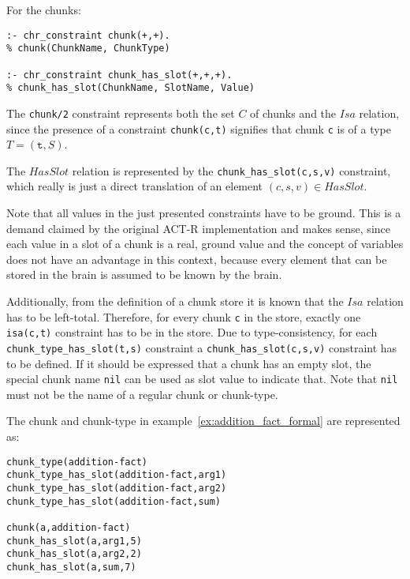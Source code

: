For the chunks:

\begin{lstlisting}
:- chr_constraint chunk(+,+).
% chunk(ChunkName, ChunkType)

:- chr_constraint chunk_has_slot(+,+,+).
% chunk_has_slot(ChunkName, SlotName, Value)
\end{lstlisting}

The \lstinline|chunk/2| constraint represents both the set $C$ of chunks and the $Isa$ relation, since the presence of a constraint \lstinline|chunk(c,t)| signifies that chunk \lstinline|c| is of a type $T = (\mathtt{t},S)$.

The $HasSlot$ relation is represented by the \lstinline|chunk_has_slot(c,s,v)| constraint, which really is just a direct translation of an element $(c,s,v) \in HasSlot$.

Note that all values in the just presented constraints have to be ground. This is a demand claimed by the original ACT-R implementation and makes sense, since each value in a slot of a chunk is a real, ground value and the concept of variables does not have an advantage in this context, because every element that can be stored in the brain is assumed to be known by the brain.

Additionally, from the definition of a chunk store it is known that the $Isa$ relation has to be left-total. Therefore, for every chunk \lstinline|c| in the store, exactly one \lstinline|isa(c,t)| constraint has to be in the store. Due to type-consistency, for each \lstinline|chunk_type_has_slot(t,s)| constraint a \lstinline|chunk_has_slot(c,s,v)| constraint has to be defined. If it should be expressed that a chunk has an empty slot, the special chunk name \lstinline|nil| can be used as slot value to indicate that. Note that \lstinline|nil| must not be the name of a regular chunk or chunk-type.

\begin{example}
\label{ex:addition_fact_chr}
The chunk and chunk-type in example~\ref{ex:addition_fact_formal} are represented as:

\begin{lstlisting}
chunk_type(addition-fact)
chunk_type_has_slot(addition-fact,arg1)
chunk_type_has_slot(addition-fact,arg2)
chunk_type_has_slot(addition-fact,sum)

chunk(a,addition-fact)
chunk_has_slot(a,arg1,5)
chunk_has_slot(a,arg2,2)
chunk_has_slot(a,sum,7)
\end{lstlisting}
\end{example}


